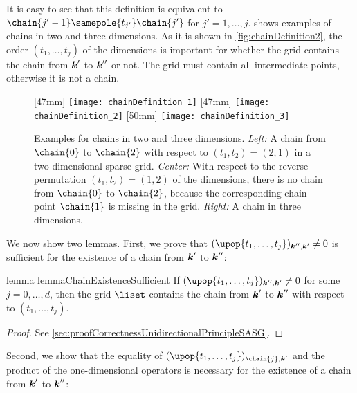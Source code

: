 It is easy to see that this definition is equivalent to
$\chain{j'-1} \samepole{t_{j'}} \chain{j'}$ for $j' = 1, \dotsc, j$.
 shows examples of chains in
two and three dimensions.
As it is shown in \cref{fig:chainDefinition2},
the order $(t_1, \dotsc, t_j)$ of the dimensions is important
for whether the grid contains the chain from ${\boldsymbol{k}}'$ to ${\boldsymbol{k}}''$ or not.
The grid must contain all intermediate points, otherwise
it is not a chain.

\begin{figure}
  [47mm]{%
    \texttt{[image: chainDefinition\_1]}%
  }%
  \hfill%
  [47mm]{%
    \texttt{[image: chainDefinition\_2]}%
    \label{fig:chainDefinition2}%
  }%
  \hfill%
  [50mm]{%
    \texttt{[image: chainDefinition\_3]}%
  }%
  \caption[%
    Examples for the definition of chains%
  ]{%
    Examples for chains in two and three dimensions.
    \emph{Left:} A chain from $\chain{0}$ to $\chain{2}$
    with respect to $(t_1, t_2) = (2, 1)$ in a two-dimensional sparse grid.
    \emph{Center:}
    With respect to the reverse permutation
    $(t_1, t_2) = (1, 2)$ of the dimensions,
    there is no chain from $\chain{0}$ to $\chain{2}$,
    because the corresponding chain point $\chain{1}$ is missing in the grid.
    \emph{Right:} A chain in three dimensions.%
  }%
  \label{fig:chainDefinition}%
\end{figure}

We now show two lemmas.
First, we prove that $(\upop{t_1,\dotsc,t_j})_{\*k'',\*k'} \not= 0$
is sufficient for the existence of a chain from ${\boldsymbol{k}}'$ to ${\boldsymbol{k}}''$:

\begin{restatable}{%
  lemma%
}{%
  lemmaChainExistenceSufficient%
}
  \label{lemma:chainExistenceSufficient}
  If $(\upop{t_1,\dotsc,t_j})_{\*k'',\*k'} \not= 0$
  for some $j = 0, \dotsc, d$,
  then the grid $\liset$ contains the chain from ${\boldsymbol{k}}'$ to ${\boldsymbol{k}}''$
  with respect to $(t_1, \dotsc, t_j)$.
\end{restatable}

\begin{proof}
  See \cref{sec:proofCorrectnessUnidirectionalPrincipleSASG}.
\end{proof}

Second, we show that the equality of
$(\upop{t_1,\dotsc,t_j})_{\chain{j},\*k'}$ and the product of
the one-dimensional operators is necessary for the
existence of a chain from ${\boldsymbol{k}}'$ to ${\boldsymbol{k}}''$:

